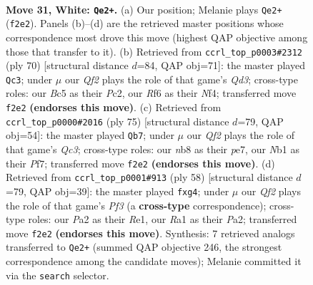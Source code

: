 \documentclass[11pt]{article}
\begin{document}
\clearpage

\begin{figure}[p]\centering
\begin{subfigure}{0.46\textwidth}\centering
\resizebox{\linewidth}{!}{%
\newchessgame
\chessboard[
  setfen={rnb1k3/8/5R2/p1Bp2q1/1p6/6r1/PPP2QP1/RN4K1 w - - 8 31},
  showmover=false,
  pgfstyle=straightmove, color=movearrow, markmove={f2-e2}
]}
\caption{}
\end{subfigure}\hfill
\begin{subfigure}{0.46\textwidth}\centering
\resizebox{\linewidth}{!}{%
\newchessgame
\chessboard[
  setfen={4k3/8/p2pp2p/1p6/3rPNqb/PP1Q1R2/2P5/1K6 w - - 1 36},
  showmover=false,
  pgfstyle=straightmove, color=movearrow, markmove={d3-c3}
]}
\caption{}
\end{subfigure}
\\[4pt]
\begin{subfigure}{0.46\textwidth}\centering
\resizebox{\linewidth}{!}{%
\newchessgame
\chessboard[
  setfen={2r3k1/4Pp2/2qp2pp/1p1R4/2n1P3/6P1/4R1KP/3Q4 b - - 1 38},
  showmover=false,
  pgfstyle=straightmove, color=movearrow, markmove={c6-b7}
]}
\caption{}
\end{subfigure}\hfill
\begin{subfigure}{0.46\textwidth}\centering
\resizebox{\linewidth}{!}{%
\newchessgame
\chessboard[
  setfen={1r5k/2q1n3/p4p1p/2pp3P/5Pr1/2P1QP2/P1B5/2K1R3 w - - 0 30},
  showmover=false,
  pgfstyle=straightmove, color=movearrow, markmove={f3-g4}
]}
\caption{}
\end{subfigure}
\caption{\textbf{Move 31, White: \texttt{Qe2+}.} (a) Our position; Melanie plays \texttt{Qe2+} (\texttt{f2e2}). Panels (b)--(d) are the retrieved master positions whose correspondence most drove this move (highest QAP objective among those that transfer to it). (b) Retrieved from \texttt{ccrl\_top\_p0003\#2312} (ply 70) [structural distance $d$=84, QAP obj=71]: the master played \texttt{Qc3}; under $\mu$ our \emph{Qf2} plays the role of that game's \emph{Qd3}; cross-type roles: our \emph{B}c5 as their \emph{P}c2, our \emph{R}f6 as their \emph{N}f4; transferred move \texttt{f2e2} \textbf{(endorses this move)}. (c) Retrieved from \texttt{ccrl\_top\_p0000\#2016} (ply 75) [structural distance $d$=79, QAP obj=54]: the master played \texttt{Qb7}; under $\mu$ our \emph{Qf2} plays the role of that game's \emph{Qc3}; cross-type roles: our \emph{n}b8 as their \emph{p}e7, our \emph{N}b1 as their \emph{P}f7; transferred move \texttt{f2e2} \textbf{(endorses this move)}. (d) Retrieved from \texttt{ccrl\_top\_p0001\#913} (ply 58) [structural distance $d$=79, QAP obj=39]: the master played \texttt{fxg4}; under $\mu$ our \emph{Qf2} plays the role of that game's \emph{Pf3} (a \textbf{cross-type} correspondence); cross-type roles: our \emph{P}a2 as their \emph{R}e1, our \emph{R}a1 as their \emph{P}a2; transferred move \texttt{f2e2} \textbf{(endorses this move)}. Synthesis: 7 retrieved analogs transferred to \texttt{Qe2+} (summed QAP objective 246, the strongest correspondence among the candidate moves); Melanie committed it via the \texttt{search} selector.}
\label{fig:thought-m60}
\end{figure}
\end{document}
